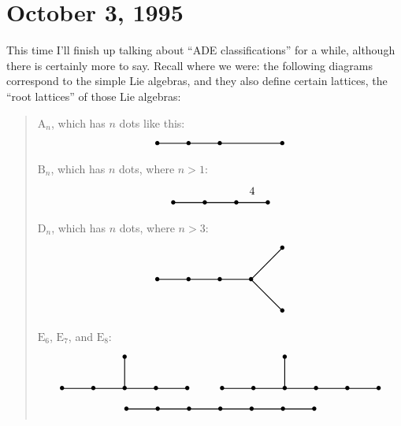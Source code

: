 \documentclass{article}
\begin{document}
\hypertarget{week65}{%
\section{October 3, 1995}\label{week65}}

This time I'll finish up talking about ``ADE classifications'' for a
while, although there is certainly more to say. Recall where we were:
the following diagrams correspond to the simple Lie algebras, and they
also define certain lattices, the ``root lattices'' of those Lie
algebras:

\begin{quote}
\(\mathrm{A}_n\), which has \(n\) dots like this: \[
  \begin{tikzpicture}
    \draw[thick] (0,0) node{$\bullet$} to (1,0) node{$\bullet$} to (2,0) node {$\bullet$} to (4,0) node{$\bullet$};
  \end{tikzpicture}
\] \(\mathrm{B}_n\), which has \(n\) dots, where \(n > 1\): \[
  \begin{tikzpicture}
    \draw[thick] (0,0) node{$\bullet$} to (1,0) node{$\bullet$} to (2,0) node{$\bullet$} to node[label=above:{4}]{} (3,0) node {$\bullet$};
  \end{tikzpicture}
\] \(\mathrm{D}_n\), which has \(n\) dots, where \(n > 3\): \[
  \begin{tikzpicture}
    \draw[thick] (0,0) node{$\bullet$} to (1,0) node{$\bullet$} to (2,0) node{$\bullet$} to (3,0) node {$\bullet$};
    \draw[thick] (3,0) to (4,1) node {$\bullet$};
    \draw[thick] (3,0) to (4,-1) node {$\bullet$};
  \end{tikzpicture}
\] \(\mathrm{E}_6\), \(\mathrm{E}_7\), and \(\mathrm{E}_8\): \[
  \begin{gathered}
    \begin{tikzpicture}
      \draw[thick] (0,0) node{$\bullet$} to (1,0) node{$\bullet$} to (2,0) node{$\bullet$} to (3,0) node {$\bullet$} to (4,0) node {$\bullet$};
      \draw[thick] (2,0) to (2,1) node{$\bullet$};
    \end{tikzpicture}
    \qquad
    \begin{tikzpicture}
      \draw[thick] (0,0) node{$\bullet$} to (1,0) node{$\bullet$} to (2,0) node{$\bullet$} to (3,0) node {$\bullet$} to (4,0) node {$\bullet$} to (5,0) node {$\bullet$};
      \draw[thick] (2,0) to (2,1) node{$\bullet$};
    \end{tikzpicture}
  \\\begin{tikzpicture}
      \draw[thick] (0,0) node{$\bullet$} to (1,0) node{$\bullet$} to (2,0) node{$\bullet$} to (3,0) node {$\bullet$} to (4,0) node {$\bullet$} to (5,0) node {$\bullet$} to (6,0) node {$\bullet$};

\end{tikzpicture}
\end{gathered}\]
\end{quote}
\end{document}
